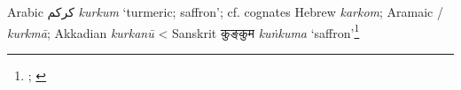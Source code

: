 \begin{etymology}\label{ety:kurkum}
Arabic {كركم} \textit{kurkum} `turmeric; saffron'; cf. cognates Hebrew  \textit{karkom}; Aramaic / \textit{kurkmā}; Akkadian  \textit{kurkanū}
< Sanskrit {कुङ्कुम } \textit{kuṅkuma} `saffron'\footnote{\textcite[s.v. kwrkm]{cal}; \textcite{guthrie_trade-language_2009}}
\end{etymology}